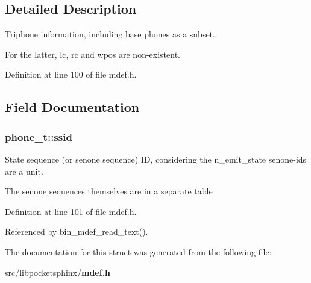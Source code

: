 \subsection{\-Detailed \-Description}
\-Triphone information, including base phones as a subset. 

\-For the latter, lc, rc and wpos are non-\/existent. 

\-Definition at line 100 of file mdef.\-h.



\subsection{\-Field \-Documentation}
\subsubsection[{ssid}]{ {\bf phone\-\_\-t\-::ssid}}\label{structphone__t_af2f31836358c1c29c38a361b3923b859}


\-State sequence (or senone sequence) \-I\-D, considering the n\-\_\-emit\-\_\-state senone-\/ids are a unit. 

\-The senone sequences themselves are in a separate table 

\-Definition at line 101 of file mdef.\-h.



\-Referenced by bin\-\_\-mdef\-\_\-read\-\_\-text().



\-The documentation for this struct was generated from the following file\-:\begin{DoxyCompactItemize}
\item 
src/libpocketsphinx/{\bf mdef.\-h}\end{DoxyCompactItemize}

